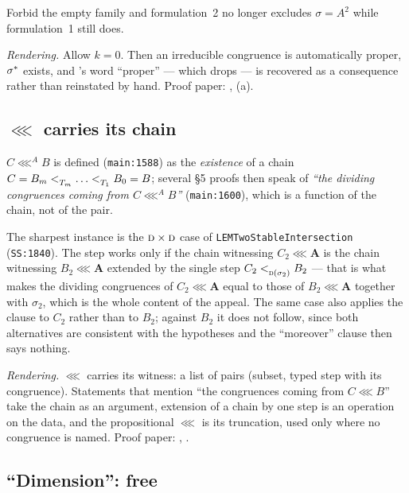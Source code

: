 Forbid the empty family and formulation~2 no longer excludes $\sigma=A^{2}$
while formulation~1 still does.

\emph{Rendering.} Allow $k=0$. Then an irreducible congruence is automatically
proper, $\sigma^{*}$ exists, and \cite{ZhukJACM}'s word ``proper'' --- which
\cite{ZhukSimplified} drops --- is recovered as a consequence rather than
reinstated by hand. Proof paper: ,
(a).

\subsection{$\lll$ carries its chain}\label{sec:leg-chain}

$C\lll^{A}B$ is defined (\texttt{main:1588}) as the \emph{existence} of a chain
$C=B_{m}\subt{T_{m}}\dots\subt{T_{1}}B_{0}=B$; several \S5 proofs then speak of
\emph{``the dividing congruences coming from $C\lll^{A}B$''}
(\texttt{main:1600}), which is a function of the chain, not of the pair.

The sharpest instance is the $\textup{\textsc{d}}\times\textup{\textsc{d}}$ case of
\texttt{LEMTwoStableIntersection} (\texttt{SS:1840}). The step works only if
the chain witnessing $C_{2}\lll\mathbf A$ is the chain witnessing
$B_{2}\lll\mathbf A$ extended by the single step $C_{2}<_{\textup{\textsc{d}}(\sigma_{2})}^{}
B_{2}$ --- that is what makes the dividing congruences of $C_{2}\lll\mathbf A$
equal to those of $B_{2}\lll\mathbf A$ together with $\sigma_{2}$, which is the
whole content of the appeal. The same case also applies the clause to $C_{2}$
rather than to $B_{2}$; against $B_{2}$ it does not follow, since both
alternatives are consistent with the hypotheses and the ``moreover'' clause
then says nothing.

\emph{Rendering.} $\lll$ carries its witness: a list of pairs (subset, typed
step with its congruence). Statements that mention ``the congruences coming
from $C\lll B$'' take the chain as an argument, extension of a chain by one
step is an operation on the data, and the propositional $\lll$ is its
truncation, used only where no congruence is named. Proof paper:
, .

\subsection{``Dimension'': free}\label{sec:leg-dimension}


